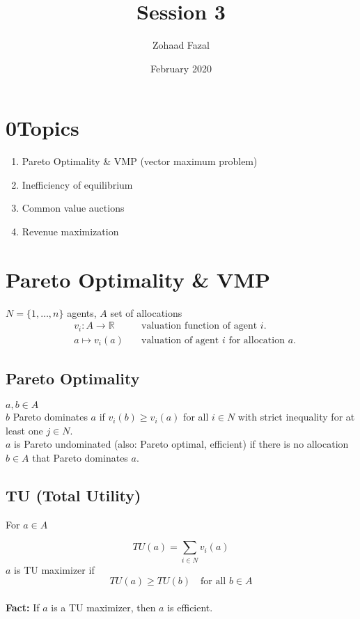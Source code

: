 \documentclass{article}
\title{Session 3}
\author{Zohaad Fazal}
\date{February 2020}
\begin{document}
\maketitle

\section*{0\quad Topics}
\begin{enumerate}
    \item Pareto Optimality \& VMP (vector maximum problem)
    \item Inefficiency of equilibrium
    \item Common value auctions
    \item Revenue maximization
\end{enumerate}

\section{Pareto Optimality \& VMP}
$N=\{1,\dots,n\}$ agents, $A$ set of allocations
\begin{equation*}
\begin{aligned}
    & v_i:A\to \mathbb{R}\quad & \text{valuation function of agent } i.\\
    & a\mapsto v_i(a)\quad & \text{valuation of agent $i$ for allocation $a$.}
\end{aligned}
\end{equation*}
\subsection*{Pareto Optimality}
$a,b\in A$\\

\noindent
$b$ Pareto dominates $a$ if $v_i(b)\geq v_i(a)$ for all $i\in N$ with strict
inequality for at least one $j\in N$.\\

\noindent
$a$ is Pareto undominated (also: Pareto optimal, efficient) if there is no allocation $b\in A$ that Pareto dominates $a$.

\subsection*{TU (Total Utility)}
For $a\in A$

\begin{equation*}
    TU(a)=\sum_{i\in N}v_i(a)
\end{equation*}
\noindent
$a$ is TU maximizer if
\begin{equation*}
    TU(a)\geq TU(b)\quad\text{for all }b\in A
\end{equation*}
\\
\noindent
\textbf{Fact:} If $a$ is a TU maximizer, then $a$ is efficient.\\
\end{document}
